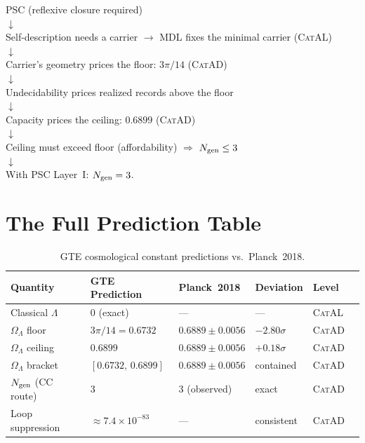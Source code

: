 \documentclass[11pt,a4paper]{article}
\newcommand{\OmL}{\Omega_\Lambda}
\newcommand{\Ngen}{N_{\rm gen}}
\newcommand{\CatAL}{\textsc{CatAL}}
\newcommand{\CatAD}{\textsc{CatAD}}
\begin{document}
\begin{tcolorbox}[colback=boxyellow,colframe=yellow!60!black,
  title={Summary: the hardware chain}]
PSC (reflexive closure required)\\
$\downarrow$\\
Self-description needs a carrier $\to$ MDL fixes the minimal carrier (\CatAL)\\
$\downarrow$\\
Carrier's geometry prices the floor: $3\pi/14$ (\CatAD)\\
$\downarrow$\\
Undecidability prices realized records above the floor\\
$\downarrow$\\
Capacity prices the ceiling: $0.6899$ (\CatAD)\\
$\downarrow$\\
Ceiling must exceed floor (affordability) $\Rightarrow$ $N_{\rm gen} \leq 3$\\
$\downarrow$\\
With PSC Layer~I: $N_{\rm gen} = 3$.
\end{tcolorbox}

\section{The Full Prediction Table}
\label{sec:table}

\begin{table}[ht]
\centering
\caption{GTE cosmological constant predictions vs.\ Planck~2018.}
\label{tab:ccpred}
\begin{tabular}{@{}llllll@{}}
\toprule
Quantity & GTE Prediction & Planck~2018 & Deviation & Level \\
\midrule
Classical $\Lambda$ & $0$ (exact) & --- & --- & \CatAL \\
$\OmL$ floor & $3\pi/14 = 0.6732$ & $0.6889 \pm 0.0056$ & $-2.80\sigma$ & \CatAD \\
$\OmL$ ceiling & $0.6899$ & $0.6889 \pm 0.0056$ & $+0.18\sigma$ & \CatAD \\
$\OmL$ bracket & $[0.6732,\,0.6899]$ & $0.6889 \pm 0.0056$ & contained & \CatAD \\
$\Ngen$ (CC route) & $3$ & 3 (observed) & exact & \CatAD \\
Loop suppression & $\approx 7.4 \times 10^{-83}$ & --- & consistent & \CatAD \\
\bottomrule
\end{tabular}
\end{table}
\end{document}
